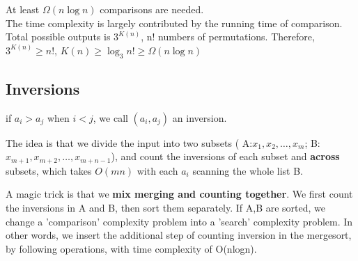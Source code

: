 \begin{remark}
    At least $\Omega(n\log n)$ comparisons are needed. \\
    The time complexity is largely contributed by the running time of comparison.
    Total possible outputs is $3^{K(n)}$, n! numbers of permutations. Therefore, $3^{K(n)}\geq n!$, $K(n)\geq \log_3n! \geq \Omega(n\log n)$

\end{remark}

\subsection{Inversions}
\begin{defi}
    if $a_i>a_j$ when $i<j$, we call $(a_i,a_j)$ an inversion.
\end{defi}

The idea is that we divide the input into two subsets ( A:$x_1, x_2, \ldots , x_{m}$; B:$x_{m+1}, x_{m+2},\ldots, x_{m+n-1}$), and count the inversions of each subset and \textbf{across} subsets, which takes $O(mn)$ with each $a_i$ scanning the whole list B.

A magic trick is that we \textbf{mix merging and counting together}. We first count the inversions in A and B, then sort them separately.
If A,B are sorted, we change a 'comparison' complexity problem into a 'search' complexity problem.
In other words, we  insert the additional step of counting inversion in the mergesort, by following operations, with time complexity of O(nlogn).


